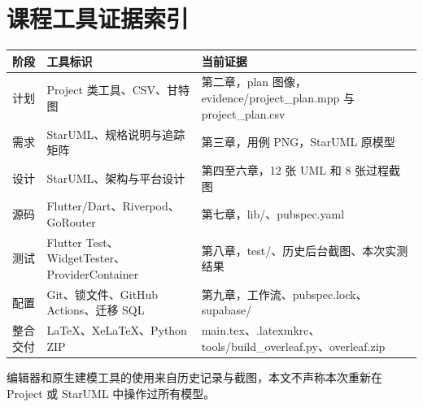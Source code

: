 \documentclass[UTF8,fontset=fandol,zihao=-4,oneside]{ctexrep}
\begin{document}
\section{课程工具证据索引}
\begin{longtable}{p{2.5cm}p{4.5cm}p{7.7cm}}
\toprule 阶段 & 工具标识 & 当前证据 \\ \midrule
计划 & Project 类工具、CSV、甘特图 & 第二章，plan 图像，evidence/project\_plan.mpp 与 project\_plan.csv \\
需求 & StarUML、规格说明与追踪矩阵 & 第三章，用例 PNG，StarUML 原模型 \\
设计 & StarUML、架构与平台设计 & 第四至六章，12 张 UML 和 8 张过程截图 \\
源码 & Flutter/Dart、Riverpod、GoRouter & 第七章，lib/、pubspec.yaml \\
测试 & Flutter Test、WidgetTester、ProviderContainer & 第八章，test/、历史后台截图、本次实测结果 \\
配置 & Git、锁文件、GitHub Actions、迁移 SQL & 第九章，工作流、pubspec.lock、supabase/ \\
整合交付 & LaTeX、XeLaTeX、Python ZIP & main.tex、.latexmkrc、tools/build\_overleaf.py、overleaf.zip \\
\bottomrule
\end{longtable}
编辑器和原生建模工具的使用来自历史记录与截图，本文不声称本次重新在 Project 或 StarUML 中操作过所有模型。
\end{document}
